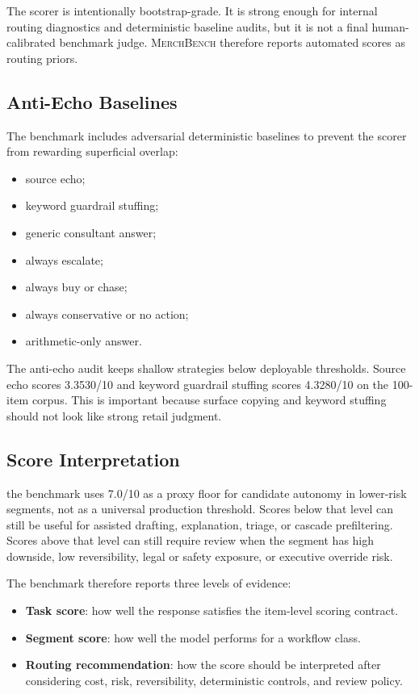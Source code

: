 \documentclass[11pt]{article}
\newcommand{\benchmark}{\textsc{MerchBench}}
\newcommand{\score}[1]{#1/10}
\begin{document}
The scorer is intentionally bootstrap-grade. It is strong enough for internal routing diagnostics and deterministic baseline audits, but it is not a final human-calibrated benchmark judge. \benchmark{} therefore reports automated scores as routing priors.

\subsection{Anti-Echo Baselines}

The benchmark includes adversarial deterministic baselines to prevent the scorer from rewarding superficial overlap:

\begin{itemize}[leftmargin=*]
  \item source echo;
  \item keyword guardrail stuffing;
  \item generic consultant answer;
  \item always escalate;
  \item always buy or chase;
  \item always conservative or no action;
  \item arithmetic-only answer.
\end{itemize}

The anti-echo audit keeps shallow strategies below deployable thresholds. Source echo scores \score{3.3530} and keyword guardrail stuffing scores \score{4.3280} on the 100-item corpus. This is important because surface copying and keyword stuffing should not look like strong retail judgment.

\subsection{Score Interpretation}

the benchmark uses \score{7.0} as a proxy floor for candidate autonomy in lower-risk segments, not as a universal production threshold. Scores below that level can still be useful for assisted drafting, explanation, triage, or cascade prefiltering. Scores above that level can still require review when the segment has high downside, low reversibility, legal or safety exposure, or executive override risk.

The benchmark therefore reports three levels of evidence:

\begin{itemize}[leftmargin=*]
  \item \textbf{Task score}: how well the response satisfies the item-level scoring contract.
  \item \textbf{Segment score}: how well the model performs for a workflow class.
  \item \textbf{Routing recommendation}: how the score should be interpreted after considering cost, risk, reversibility, deterministic controls, and review policy.
\end{itemize}
\end{document}
